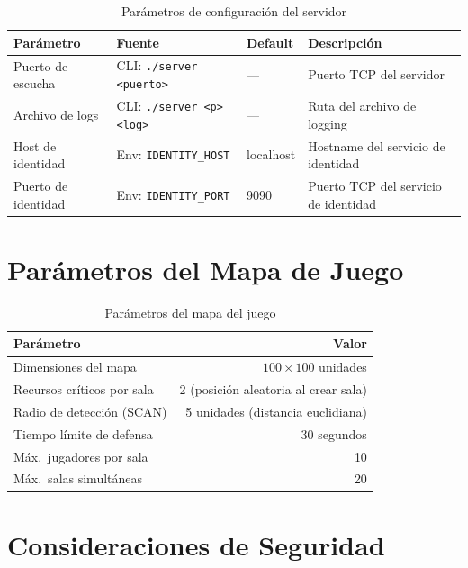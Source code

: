 \documentclass[12pt, letterpaper]{article}
\begin{document}
\begin{table}[H]
\centering
\begin{tabularx}{\textwidth}{l l l X}
\toprule
\textbf{Parámetro} & \textbf{Fuente} & \textbf{Default} & \textbf{Descripción} \\
\midrule
Puerto de escucha    & CLI: \texttt{./server <puerto>}   & ---         & Puerto TCP del servidor \\
Archivo de logs      & CLI: \texttt{./server <p> <log>}  & ---         & Ruta del archivo de logging \\
Host de identidad    & Env: \texttt{IDENTITY\_HOST}      & localhost   & Hostname del servicio de identidad \\
Puerto de identidad  & Env: \texttt{IDENTITY\_PORT}      & 9090        & Puerto TCP del servicio de identidad \\
\bottomrule
\end{tabularx}
\caption{Parámetros de configuración del servidor}
\end{table}

\section{Parámetros del Mapa de Juego}

\begin{table}[H]
\centering
\begin{tabular}{l r}
\toprule
\textbf{Parámetro} & \textbf{Valor} \\
\midrule
Dimensiones del mapa             & $100 \times 100$ unidades \\
Recursos críticos por sala       & 2 (posición aleatoria al crear sala) \\
Radio de detección (\textsc{SCAN}) & 5 unidades (distancia euclidiana) \\
Tiempo límite de defensa         & 30 segundos \\
Máx.\ jugadores por sala         & 10 \\
Máx.\ salas simultáneas          & 20 \\
\bottomrule
\end{tabular}
\caption{Parámetros del mapa del juego}
\end{table}

\section{Consideraciones de Seguridad}
\end{document}
